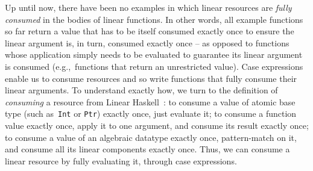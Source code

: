 \documentclass[acmsmall,review,anonymous]{acmart}
\newcommand{\lolli}{\multimap}
\newcommand{\tensor}{\otimes}
\begin{document}
Up until now, there
have been no examples in which linear resources are \emph{fully consumed} in
the bodies of linear functions. In other words, all example functions so far
return a value that has to be itself consumed exactly once to ensure the linear
argument is, in turn, consumed exactly once -- as opposed to functions whose
application simply needs to be evaluated to guarantee its linear argument is
consumed (e.g.,~functions that return an unrestricted value).
%
%
%
%
Case expressions enable us to consume resources and so write
functions that fully consume their linear arguments.
To understand exactly how,
we turn to the definition of \emph{consuming} a resource from Linear
Haskell~\cite{cite:linearhaskell}:
to consume a value of atomic base type (such as~\texttt{Int} or
        \texttt{Ptr}) exactly once, just evaluate it;
        to consume a function value exactly once, apply it to one argument,
        and consume its result exactly once;
        to consume a value of an algebraic datatype exactly once,
        pattern-match on it, and consume all its linear components exactly once.
Thus, we can consume a linear resource by fully evaluating it, through case
expressions.

\end{document}
